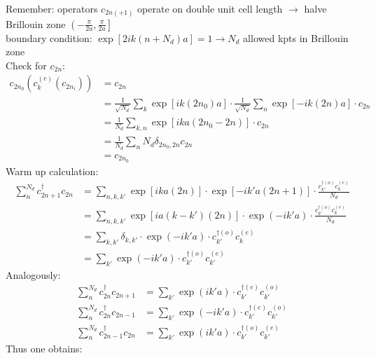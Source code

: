 Remember: operators $c_{2n(+1)}$ operate on double unit cell length $\rightarrow$ halve Brillouin zone $\left(-\frac{\pi}{2a}, \frac{\pi}{2a}\right]$\\
boundary condition: $\exp\left[2ik\left(n+N_d\right)a\right] = 1 \rightarrow N_d$ allowed kpts in Brillouin zone\\
Check for $c_{2n}$:
\begin{align}
	c_{2n_0}(c_k^{(e)}(c_{2n_i})) &= c_{2n} \\
	&= \frac{1}{\sqrt{N_d}}\sum_k\exp\left[ik\left(2n_0\right)a\right]\cdot \frac{1}{\sqrt{N_d}}\sum_n \exp\left[-ik\left(2n\right)a\right]\cdot c_{2n}\\
	&= \frac{1}{N_d}\sum_{k, n} \exp\left[ika\left(2n_0-2n\right)\right]\cdot c_{2n}\\
	&= \frac{1}{N_d}\sum_n N_d \delta_{2n_0,2n} c_{2n}\\
	&= c_{2n_0}
\end{align}
Warm up calculation:
\begin{align}
	\sum_n^{N_d}c_{2n+1}^\dagger c_{2n} &=\sum_{n, k, k'} \exp\left[ika(2n)\right] \cdot \exp\left[-ik'a(2n+1)\right] \cdot \frac{c_{k'}^{\dagger(o)}c_k^{(e)}}{N_d} \\
	&=\sum_{n, k, k'} \exp\left[ia(k-k')(2n)\right] \cdot \exp\left(-ik'a\right) \cdot  \frac{c_{k'}^{\dagger(o)}c_k^{(e)}}{N_d} \\
	&=\sum_{k, k'} \delta_{k, k'} \cdot \exp\left(-ik'a\right)\cdot c_{k'}^{\dagger(o)}c_k^{(e)}\\
	&=\sum_{k'} \exp\left(-ik'a\right) \cdot c_{k'}^{\dagger(o)}c_{k'}^{(e)}
\end{align}
Analogously:
\begin{align}
	\sum_n^{N_d} c_{2n}^\dagger c_{2n+1} &=\sum_{k'} \exp\left(ik'a\right)\cdot c_{k'}^{\dagger(e)}c_{k'}^{(o)}\\
	\sum_n^{N_d} c_{2n}^\dagger c_{2n-1}&=\sum_{k'} \exp\left(-ik'a\right)\cdot  c_{k'}^{\dagger(e)}c_{k'}^{(o)}\\
	\sum_n^{N_d} c_{2n-1}^\dagger c_{2n} &=\sum_{k'} \exp\left(ik'a\right)\cdot  c_{k'}^{\dagger(o)}c_{k'}^{(e)}
\end{align}
Thus one obtains:
